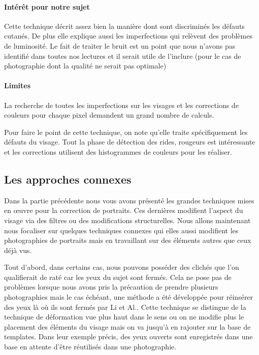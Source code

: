 \documentclass[11pt, french]{report-rd-info}
\begin{document}
\paragraph{Intérêt pour notre sujet}
Cette technique décrit assez bien la manière dont sont discriminés les défauts cutanés. De plus elle explique aussi les imperfections qui relèvent des problèmes de luminosité. Le fait de traiter le bruit est un point que nous n’avons pas identifié dans toutes nos lectures et il serait utile de l’inclure (pour le cas de photographie dont la qualité ne serait pas optimale)

\paragraph{Limites}
La recherche de toutes les imperfections sur les visages et les corrections de couleurs pour chaque pixel demandent un grand nombre de calculs. 

Pour faire le point de cette technique, on note qu’elle traite spécifiquement les défauts du visage. Tout la phase de détection des rides, rougeurs est intéressante et les corrections utilisent des histogrammes de couleurs pour les réaliser.

\subsection{Les approches connexes}

Dans la partie précédente nous vous avons présenté les grandes techniques mises en œuvre pour la correction de portraits. Ces dernières modifient l’aspect du visage via des filtres ou des modifications structurelles. Nous allons maintenant nous focaliser sur quelques techniques connexes qui elles aussi modifient les photographies de portraits mais en travaillant sur des éléments autres que ceux déjà vus.
 
Tout d’abord, dans certains cas, nous pouvons posséder des clichés que l'on qualifierait de raté car les yeux du sujet sont fermés. Cela ne pose pas de problèmes lorsque nous avons pris la précaution de prendre plusieurs photographies mais le cas échéant, une méthode a été développée pour réinsérer des yeux là où ils sont fermés par Li et Al.\cite{Li2011}. Cette technique se distingue de la technique de déformation vue plus haut dans le sens ou on ne modifie plus le placement des éléments du visage mais on va jusqu'à en rajouter sur la base de templates. Dans leur exemple précis, des yeux ouverts sont enregistrés dans une base en attente d’être réutilisés dans une photographie.
\end{document}
